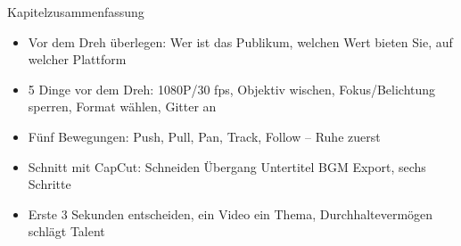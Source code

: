 \begin{tcbsummary}{Kapitelzusammenfassung}
\begin{itemize}
  \item Vor dem Dreh überlegen: Wer ist das Publikum, welchen Wert bieten Sie, auf welcher Plattform
  \item 5 Dinge vor dem Dreh: 1080P/30 fps, Objektiv wischen, Fokus/Belichtung sperren, Format wählen, Gitter an
  \item Fünf Bewegungen: Push, Pull, Pan, Track, Follow – Ruhe zuerst
  \item Schnitt mit CapCut: Schneiden Übergang Untertitel BGM Export, sechs Schritte
  \item Erste 3 Sekunden entscheiden, ein Video ein Thema, Durchhaltevermögen schlägt Talent
\end{itemize}

\end{tcbsummary}

